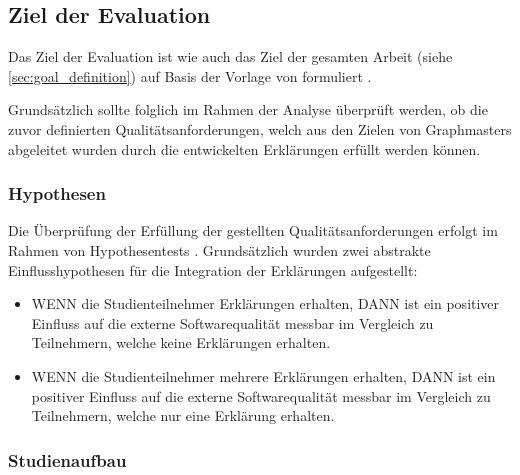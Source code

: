\subsection{Ziel der Evaluation}

Das Ziel der Evaluation ist wie auch das Ziel der gesamten Arbeit (siehe \autoref{sec:goal_definition}) auf Basis der Vorlage von \citeauthor{wohlin2012experimentation} formuliert \cite{wohlin2012experimentation}.

\smallskip

\noindent{}

\smallskip

Grundsätzlich sollte folglich im Rahmen der Analyse überprüft werden, ob die zuvor definierten Qualitätsanforderungen, welch aus den Zielen von Graphmasters abgeleitet wurden durch die entwickelten Erklärungen erfüllt werden können.

\subsubsection{Hypothesen}

Die Überprüfung der Erfüllung der gestellten Qualitätsanforderungen erfolgt im Rahmen von Hypothesentests \cite{wohlin2012experimentation}. Grundsätzlich wurden zwei abstrakte Einflusshypothesen für die Integration der Erklärungen aufgestellt:

\begin{itemize}
    \item WENN die Studienteilnehmer Erklärungen erhalten, DANN ist ein positiver Einfluss auf die externe Softwarequalität messbar im Vergleich zu Teilnehmern, welche keine Erklärungen erhalten.
    \item WENN die Studienteilnehmer mehrere Erklärungen erhalten, DANN ist ein positiver Einfluss auf die externe Softwarequalität messbar im Vergleich zu Teilnehmern, welche nur eine Erklärung erhalten.
\end{itemize}

\subsubsection{Studienaufbau}

